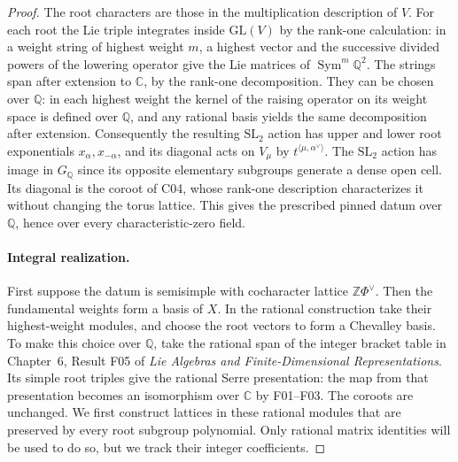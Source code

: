 \documentclass[11pt,a4paper,openany,oneside]{book}
\theoremstyle{resultstyle}
\theoremstyle{definition}
\numberwithin{equation}{chapter}
\newcommand{\GL}{\mathrm{GL}}
\newcommand{\SL}{\mathrm{SL}}
\newcommand{\ZZ}{\mathbb{Z}}
\newcommand{\QQ}{\mathbb{Q}}
\begin{document}
\begin{proof}
The root characters are those in the multiplication
description of \(V\). For each root the Lie triple integrates
inside \(\GL(V)\) by the rank-one calculation:
in a weight string of highest weight \(m\), a highest
vector and the successive divided powers of the lowering
operator give the Lie matrices of \(\operatorname{Sym}^m\QQ^2\).
The strings span after extension to \(\mathbb C\), by the
rank-one decomposition. They can be chosen over \(\QQ\):
in each highest weight the kernel of the raising
operator on its weight space is defined over \(\QQ\),
and any rational basis yields the same decomposition
after extension. Consequently the resulting \(\SL_2\)
action has upper and lower root exponentials
\(x_\alpha,x_{-\alpha}\), and its diagonal acts on
\(V_\mu\) by \(t^{\langle\mu,\alpha^\vee\rangle}\).
The \(\SL_2\) action has image in \(G_\QQ\) since
its opposite elementary subgroups generate a dense
open cell. Its diagonal is the coroot of C04, whose
rank-one description characterizes it without changing
the torus lattice. This gives the prescribed pinned datum
over \(\QQ\), hence over every characteristic-zero field.

\paragraph{Integral realization.}
First suppose the datum is semisimple with cocharacter
lattice \(\ZZ\Phi^\vee\). Then the fundamental weights
form a basis of \(X\). In the rational construction
take their highest-weight modules, and choose the
root vectors to form a Chevalley basis. To make this
choice over \(\QQ\), take the rational span of the
integer bracket table in Chapter~6, Result F05 of
\emph{Lie Algebras and Finite-Dimensional Representations}.
Its simple root triples give the rational Serre
presentation: the map from that presentation becomes
an isomorphism over \(\mathbb C\) by F01--F03.
The coroots are unchanged. We first construct lattices
in these rational modules that are preserved by
every root subgroup polynomial. Only rational matrix
identities will be used to do so, but we track their
integer coefficients.


\end{proof}
\end{document}
